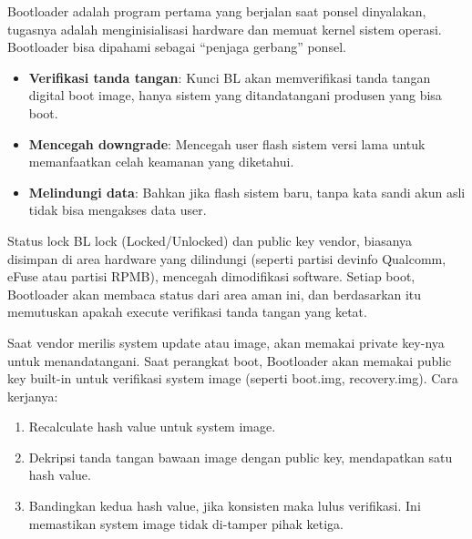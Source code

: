 


Bootloader adalah program pertama yang berjalan saat ponsel dinyalakan, tugasnya adalah menginisialisasi hardware dan memuat kernel sistem operasi. Bootloader bisa dipahami sebagai “penjaga gerbang” ponsel.


\begin{itemize}
  \item \textbf{Verifikasi tanda tangan}: Kunci BL akan memverifikasi tanda tangan digital boot image, hanya sistem yang ditandatangani produsen yang bisa boot.
  \item \textbf{Mencegah downgrade}: Mencegah user flash sistem versi lama untuk memanfaatkan celah keamanan yang diketahui.
  \item \textbf{Melindungi data}: Bahkan jika flash sistem baru, tanpa kata sandi akun asli tidak bisa mengakses data user.
\end{itemize}


Status lock BL lock (Locked/Unlocked) dan public key vendor, biasanya disimpan di area hardware yang dilindungi (seperti partisi devinfo Qualcomm, eFuse atau partisi RPMB), mencegah dimodifikasi software. Setiap boot, Bootloader akan membaca status dari area aman ini, dan berdasarkan itu memutuskan apakah execute verifikasi tanda tangan yang ketat.


Saat vendor merilis system update atau image, akan memakai private key-nya untuk menandatangani. Saat perangkat boot, Bootloader akan memakai public key built-in untuk verifikasi system image (seperti boot.img, recovery.img). Cara kerjanya:

\begin{enumerate}
  \item Recalculate hash value untuk system image.
  \item Dekripsi tanda tangan bawaan image dengan public key, mendapatkan satu hash value.
  \item Bandingkan kedua hash value, jika konsisten maka lulus verifikasi. Ini memastikan system image tidak di-tamper pihak ketiga.
\end{enumerate}

